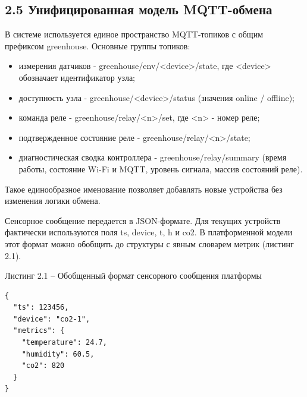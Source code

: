 \documentclass[a4paper,14pt]{extarticle}
\renewcommand{\texttt}[1]{\textnormal{#1}}
\providecommand{\tightlist}{%
  \setlength{\itemsep}{0pt}\setlength{\parskip}{0pt}}
\begin{document}
\hypertarget{ux443ux43dux438ux444ux438ux446ux438ux440ux43eux432ux430ux43dux43dux430ux44f-ux43cux43eux434ux435ux43bux44c-mqtt-ux43eux431ux43cux435ux43dux430}{%
\subsection{2.5 Унифицированная модель
MQTT-обмена}\label{ux443ux43dux438ux444ux438ux446ux438ux440ux43eux432ux430ux43dux43dux430ux44f-ux43cux43eux434ux435ux43bux44c-mqtt-ux43eux431ux43cux435ux43dux430}}

В системе используется единое пространство MQTT-топиков с общим
префиксом \texttt{greenhouse}. Основные группы топиков:

\begin{itemize}
\tightlist
\item
  измерения датчиков -
  \texttt{greenhouse/env/\textless{}device\textgreater{}/state}, где
  \texttt{\textless{}device\textgreater{}} обозначает идентификатор
  узла;
\item
  доступность узла -
  \texttt{greenhouse/\textless{}device\textgreater{}/status} (значения
  \texttt{online} / \texttt{offline});
\item
  команда реле -
  \texttt{greenhouse/relay/\textless{}n\textgreater{}/set}, где
  \texttt{\textless{}n\textgreater{}} - номер реле;
\item
  подтвержденное состояние реле -
  \texttt{greenhouse/relay/\textless{}n\textgreater{}/state};
\item
  диагностическая сводка контроллера - \texttt{greenhouse/relay/summary}
  (время работы, состояние Wi-Fi и MQTT, уровень сигнала, массив
  состояний реле).
\end{itemize}

Такое единообразное именование позволяет добавлять новые устройства без
изменения логики обмена.

Сенсорное сообщение передается в JSON-формате. Для текущих устройств
фактически используются поля \texttt{ts}, \texttt{device}, \texttt{t},
\texttt{h} и \texttt{co2}. В платформенной модели этот формат можно
обобщить до структуры с явным словарем метрик (листинг 2.1).

Листинг 2.1 -- Обобщенный формат сенсорного сообщения платформы

\par\noindent\begin{minipage}{\linewidth}
\begin{verbatim}
{
  "ts": 123456,
  "device": "co2-1",
  "metrics": {
    "temperature": 24.7,
    "humidity": 60.5,
    "co2": 820
  }
}
\end{verbatim}
\end{minipage}\par
\end{document}
